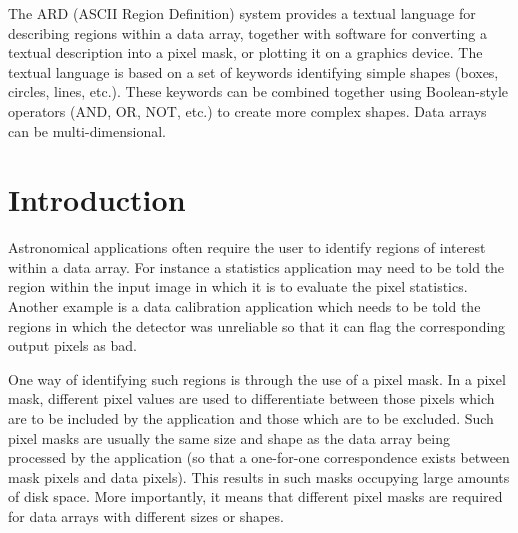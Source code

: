 The ARD (ASCII Region Definition) system provides a textual language for 
describing regions within a data array, together with software for converting
a textual description into a pixel mask, or plotting it on a graphics
device. The textual language is based on a set of keywords identifying simple 
shapes (boxes, circles, lines, etc.). These keywords can be combined together 
using Boolean-style operators (AND, OR, NOT, etc.) to create more complex 
shapes. Data arrays can be multi-dimensional.
 \newpage
 \begin{latexonly}
   \setlength{\parskip}{0mm}
   \latexonlytoc
   \setlength{\parskip}{\medskipamount}
   \markright{\stardocname}
 \end{latexonly}
\newpage
\renewcommand{\thepage}{\arabic{page}}
\setcounter{page}{1}


\section{Introduction}

Astronomical applications often require the user to identify regions of interest
within a data array. For instance a statistics application may need to be told
the region within the input image in which it is to evaluate the pixel
statistics. Another example is a data calibration application which needs
to be told the regions in which the detector was unreliable so that it can flag
the corresponding output pixels as bad.

One way of identifying such regions is through the use of a pixel mask. In a
pixel mask, different pixel values are used to differentiate between those
pixels which are to be included by the application and those which are to be
excluded. Such pixel masks are usually the same size and shape as the data array
being processed by the application (so that a one-for-one correspondence exists
between mask pixels and data pixels). This results in such masks occupying large
amounts of disk space. More importantly, it means that different pixel masks are
required for data arrays with different sizes or shapes. 

